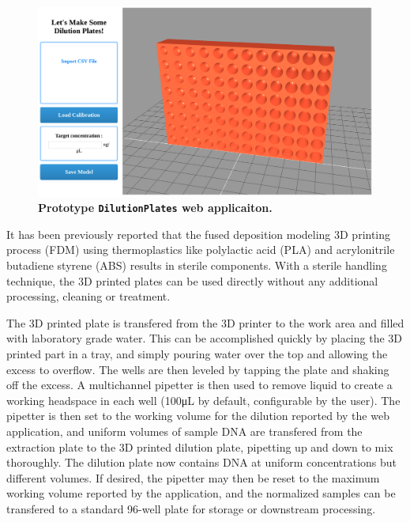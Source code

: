 \begin{refsection}
\begin{figure}
    \centering
    \includegraphics[width=\textwidth]{DilutionPlates/figures/fig1}
    \caption{\textbf{Prototype {\tt DilutionPlates} web applicaiton.}}
    \label{DP_fig1}
\end{figure}

It has been previously reported that the fused deposition modeling 3D printing process (FDM) using thermoplastics like polylactic acid (PLA) and acrylonitrile butadiene styrene (ABS) results in sterile components. \cite{neches2016intrinsic} With a sterile handling technique, the 3D printed plates can be used directly without any additional processing, cleaning or treatment.

The 3D printed plate is transfered from the 3D printer to the work area and filled with laboratory grade water. This can be accomplished quickly by placing the 3D printed part in a tray, and simply pouring water over the top and allowing the excess to overflow. The wells are then leveled by tapping the plate and shaking off the excess. A multichannel pipetter is then used to remove liquid to create a working headspace in each well (100\si{\micro\liter} by default, configurable by the user). The pipetter is then set to the working volume for the dilution reported by the web application, and uniform volumes of sample DNA are transfered from the extraction plate to the 3D printed dilution plate, pipetting up and down to mix thoroughly. The dilution plate now contains DNA at uniform concentrations but different volumes. If desired, the pipetter may then be reset to the maximum working volume reported by the application, and the normalized samples can be transfered to a standard 96-well plate for storage or downstream processing.




\end{refsection}

